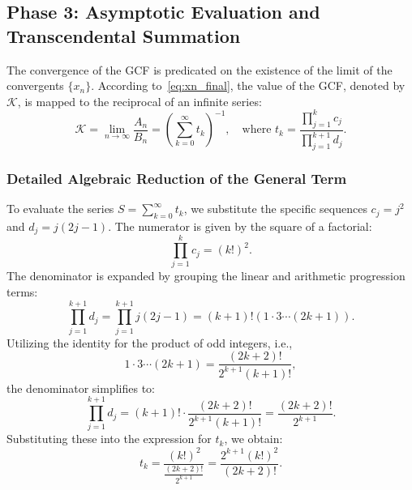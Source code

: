 \documentclass[pdflatex,sn-mathphys-num]{sn-jnl}
\theoremstyle{thmstyleone}
\theoremstyle{thmstyletwo}
\theoremstyle{thmstylethree}
\begin{document}
	
	\subsection{Phase 3: Asymptotic Evaluation and Transcendental Summation}
	
	The convergence of the GCF is predicated on the existence of the limit of the convergents $\{x_n\}$. According to~\eqref{eq:xn_final}, the value of the GCF, denoted by $\mathcal{K}$, is mapped to the reciprocal of an infinite series:
	\begin{equation}\label{eq:limit_mapping}
		\mathcal{K} = \lim_{n \to \infty} \frac{A_n}{B_n} = \left( \sum_{k=0}^{\infty} t_k \right)^{-1}, \quad \text{where } t_k = \frac{\prod_{j=1}^{k} c_j}{\prod_{j=1}^{k+1} d_j}.
	\end{equation}
	
	\subsubsection{Detailed Algebraic Reduction of the General Term}
	To evaluate the series $S = \sum_{k=0}^{\infty} t_k$, we substitute the specific sequences $c_j = j^2$ and $d_j = j(2j-1)$. The numerator is given by the square of a factorial:
	\begin{equation}
		\prod_{j=1}^k c_j = (k!)^2.
	\end{equation}
	The denominator is expanded by grouping the linear and arithmetic progression terms:
	\begin{equation}
		\prod_{j=1}^{k+1} d_j = \prod_{j=1}^{k+1} j(2j-1) = (k+1)! \left( 1 \cdot 3 \cdots (2k+1) \right).
	\end{equation}
	Utilizing the identity for the product of odd integers, i.e.,
	\begin{equation}
		1 \cdot 3 \cdots (2k+1) = \frac{(2k+2)!}{2^{k+1}(k+1)!},
	\end{equation}
	the denominator simplifies to:
	\begin{equation}
		\prod_{j=1}^{k+1} d_j = (k+1)! \cdot \frac{(2k+2)!}{2^{k+1}(k+1)!} = \frac{(2k+2)!}{2^{k+1}}.
	\end{equation}
	Substituting these into the expression for $t_k$, we obtain:
	\begin{equation}
		t_k = \frac{(k!)^2}{\frac{(2k+2)!}{2^{k+1}}} = \frac{2^{k+1} (k!)^2}{(2k+2)!}.
	\end{equation}
	
\end{document}

